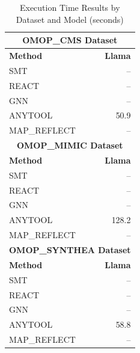 \begin{table}[htbp]
\centering
\caption{Execution Time Results by Dataset and Model (seconds)}
\label{tab:execution_times}
\begin{tabular}{lr}
\toprule
\multicolumn{2}{c}{\textbf{OMOP_CMS Dataset}} \\
\midrule
\textbf{Method} & \textbf{Llama} \\
\midrule
SMT & -- \\
REACT & -- \\
GNN & -- \\
ANYTOOL & 50.9 \\
MAP_REFLECT & -- \\
\midrule
\multicolumn{2}{c}{\textbf{OMOP_MIMIC Dataset}} \\
\midrule
\textbf{Method} & \textbf{Llama} \\
\midrule
SMT & -- \\
REACT & -- \\
GNN & -- \\
ANYTOOL & 128.2 \\
MAP_REFLECT & -- \\
\midrule
\multicolumn{2}{c}{\textbf{OMOP_SYNTHEA Dataset}} \\
\midrule
\textbf{Method} & \textbf{Llama} \\
\midrule
SMT & -- \\
REACT & -- \\
GNN & -- \\
ANYTOOL & 58.8 \\
MAP_REFLECT & -- \\
\bottomrule
\end{tabular}
\end{table}